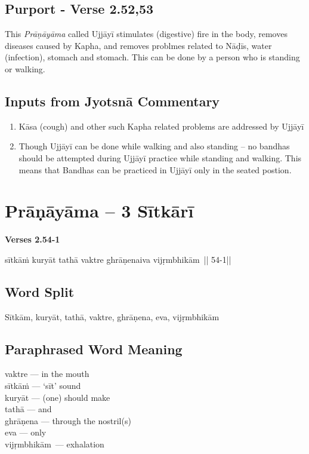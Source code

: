 \subsection*{Purport - Verse 2.52,53}


This \textit{Prāṇāyāma} called Ujjāyī stimulates (digestive) fire in the body, removes diseases caused by Kapha, and removes problmes related to Nāḍīs, water (infection), stomach and stomach. This can be done by a person who is standing or walking.

\subsection*{Inputs from Jyotsnā Commentary}


\begin{enumerate}
\item Kāsa (cough) and other such Kapha related problems are addressed by Ujjāyī 
\item Though Ujjāyī can be done while walking and also standing – no bandhas should be attempted during Ujjāyī practice while standing and walking. This means that Bandhas can be practiced in Ujjāyī only in the seated postion. 
\end{enumerate}
\newpage

\section*{Prāṇāyāma -- 3 Sītkārī}

\noindent \textbf{Verses 2.54-1 }

\begin{center}
sītkāṁ kuryāt tathā vaktre ghrāṇenaiva vijṛmbhikām || 54-1||
\end{center}

\subsection*{Word Split}


Sītkām, kuryāt, tathā, vaktre, ghrāṇena, eva, vijṛmbhikām

\subsection*{Paraphrased Word Meaning}


\begin{multicols}{2}
vaktre --- in the mouth \\
sītkāṁ --- ‘sīt’ sound \\
kuryāt --- (one) should make \\
tathā  --- and \\
ghrāṇena --- through the nostril(s)\\
eva --- only \\
vijṛmbhikām --- exhalation
\end{multicols}

